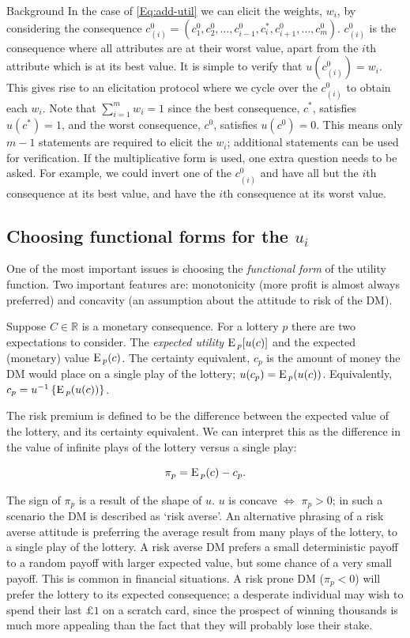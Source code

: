 \begin{chapter}{Background \label{Ch:background}}
In the case of \cref{Eq:add-util} we can elicit the weights, $w_i$, by considering the consequence $c_{(i)}^0 = (c_1^0, c_2^0, \ldots, c_{i-1}^0, c_i^{*}, c_{i+1}^0, \ldots, c_m^0)$. $c_{(i)}^0$ is the consequence where all attributes are at their worst value, apart from the $i$th attribute which is at its best value. It is simple to verify that $u(c_{(i)}^0) = w_i$. This gives rise to an elicitation protocol where we cycle over the $c_{(i)}^0$ to obtain each $w_i$. Note that $\sum_{i=1}^m w_i = 1$ since the best consequence, $c^{*}$, satisfies $u(c^{*})=1$, and the worst consequence, $c^0$, satisfies $u(c^0) = 0$. This means only $m-1$ statements are required to elicit the $w_i$; additional statements can be used for verification. If the multiplicative form is used, one extra question needs to be asked. For example, we could invert one of the $c_{(i)}^0$ and have all but the $i$th consequence at its best value, and have the $i$th consequence at its worst value.

\subsection{Choosing functional forms for the $u_i$}

One of the most important issues is choosing the \textit{functional form} of the utility function. Two important features are: monotonicity (more profit is almost always preferred) and concavity (an assumption about the attitude to risk of the DM).

Suppose $C \in \mathbb{R}$ is a monetary consequence. For a lottery $p$ there are two expectations to consider. The \textit{expected utility} $\textrm{E}\,_p[u(c)]$ and the expected (monetary) value $\textrm{E}\,_{p} (c)$. The certainty equivalent, $c_p$ is the amount of money the DM would place on a single play of the lottery; $u(c_p) = \textrm{E}\,_p(u(c))$. Equivalently, $c_p = u^{-1} \left\{ \textrm{E}\,_{p} (u(c)) \right\}$.

The risk premium is defined to be the difference between the expected value of the lottery, and its certainty equivalent. We can interpret this as the difference in the value of infinite plays of the lottery versus a single play:

\begin{equation}
	\pi_p = \textrm{E}\,_p (c) - c_p.
\end{equation}

The sign of $\pi_p$ is a result of the shape of $u$. $u$ is concave $\iff$ $\pi_p > 0$;  in such a scenario the DM is described as `risk averse'. An alternative phrasing of a risk averse attitude is preferring the average result from many plays of the lottery, to a single play of the lottery. A risk averse DM prefers a small deterministic payoff to a random payoff with larger expected value, but some chance of a very small payoff. This is common in financial situations. A risk prone DM ($\pi_p < 0$) will prefer the lottery to its expected consequence; a desperate individual may wish to spend their last $\pounds 1$ on a scratch card, since the prospect of winning thousands is much more appealing than the fact that they will probably lose their stake.


\end{chapter}
